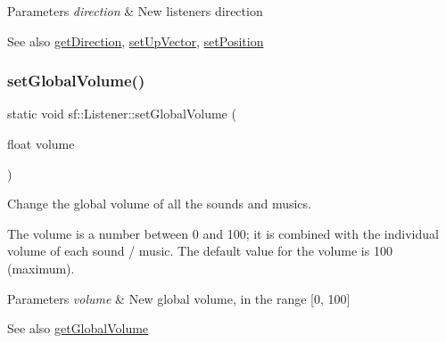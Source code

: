 \begin{DoxyParams}{Parameters}
{\em direction} & New listener\textquotesingle{}s direction\\
\hline
\end{DoxyParams}
\begin{DoxySeeAlso}{See also}
\hyperlink{classsf_1_1_listener_a54e91baba51d4431474f53ff7f9309f9}{get\+Direction}, \hyperlink{classsf_1_1_listener_a0ea9b3083a994b2b90253543bc4e3ad6}{set\+Up\+Vector}, \hyperlink{classsf_1_1_listener_a5bc2d8d18ea2d8f339d23cbf17678564}{set\+Position} 
\end{DoxySeeAlso}
\mbox{\label{classsf_1_1_listener_a803a24a1fc04620cacc9f88c6fbc0e3a}} 
\subsubsection{\texorpdfstring{set\+Global\+Volume()}{setGlobalVolume()}}
{\footnotesize\ttfamily static void sf\+::\+Listener\+::set\+Global\+Volume (\begin{DoxyParamCaption}\item[{float}]{volume }\end{DoxyParamCaption})\hspace{0.3cm}{\ttfamily [static]}}



Change the global volume of all the sounds and musics. 

The volume is a number between 0 and 100; it is combined with the individual volume of each sound / music. The default value for the volume is 100 (maximum).


\begin{DoxyParams}{Parameters}
{\em volume} & New global volume, in the range \mbox{[}0, 100\mbox{]}\\
\hline
\end{DoxyParams}
\begin{DoxySeeAlso}{See also}
\hyperlink{classsf_1_1_listener_a137ea535799bdf70be6ec969673d4d33}{get\+Global\+Volume} 
\end{DoxySeeAlso}
\mbox{\label{classsf_1_1_listener_a5bc2d8d18ea2d8f339d23cbf17678564}} 
